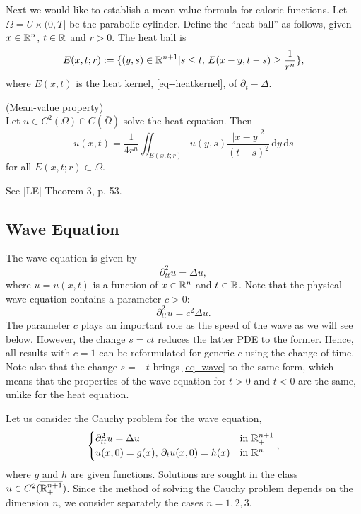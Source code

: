 \documentclass[11pt]{article}
\begin{document}
			Next we would like to establish a mean-value formula for caloric functions. 
			Let $\Omega=U\times(0,T]$ be the parabolic cylinder. Define the ``heat ball'' as follows, given $x\in\mathbb{R}^n$, $t\in\mathbb{R}$ and $r>0$. The heat ball is
			\begin{equation*}
				E(x,t;r):=\{(y,s)\in\mathbb{R}^{n+1}|s\le t,\,E(x-y,t-s)\ge\frac{1}{r^n}\},
			\end{equation*} 
			where $E(x,t)$ is the heat kernel, \eqref{eq--heatkernel}, of $\partial_t-\Delta$. 

			\begin{thm}
				(Mean-value property)\\
				Let $u\in C^2(\Omega)\cap C(\bar{\Omega})$ solve the heat equation. Then
				\begin{equation*}
					u(x,t)=\frac{1}{4r^n}\iint_{E(x,t;r)}u(y,s)\frac{|x-y|^2}{(t-s)^2}\,\mathrm{d}y\,\mathrm{d}s
				\end{equation*}
				for all $E(x,t;r)\subset\Omega$.
			\end{thm}
			\begin{pproof}
				See [LE] Theorem 3, p. 53.
			\end{pproof}


		\subsection{Wave Equation}

			The wave equation is given by
			\begin{equation}\label{eq--wave}
				\partial_{tt}^2u=\Delta u,
			\end{equation}
			where $u=u(x,t)$ is a function of $x\in\mathbb{R}^n$ and $t\in\mathbb{R}$. Note that the physical wave equation contains a parameter $c>0$:
			\begin{equation*}
				\partial_{tt}^2u=c^2\Delta u.
			\end{equation*}
			The parameter $c$ plays an important role as the speed of the wave as we will see below. However, the change $s=ct$ reduces the latter PDE to the former. Hence, all results with $c=1$ can be reformulated for generic $c$ using the change of time. Note also that the change $s=-t$ brings \eqref{eq--wave} to the same form, which means that the properties of the wave equation for $t>0$ and $t<0$ are the same, unlike for the heat equation.

			Let us consider the Cauchy problem for the wave equation,
			\begin{equation*}
				\begin{cases}
					\partial_{tt}^2u=\Delta u & \text{in }\mathbb{R}^{n+1}_+\\
					u(x,0)=g(x),\,\partial_tu(x,0)=h(x) & \text{in }\mathbb{R}^n
				\end{cases},
			\end{equation*}
			where $g$ and $h$ are given functions. Solutions are sought in the class $u\in C^2(\overline{\mathbb{R}^{n+1}_+})$. Since the method of solving the Cauchy problem depends on the dimension $n$, we consider separately the cases $n=1,2,3$.
\end{document}
